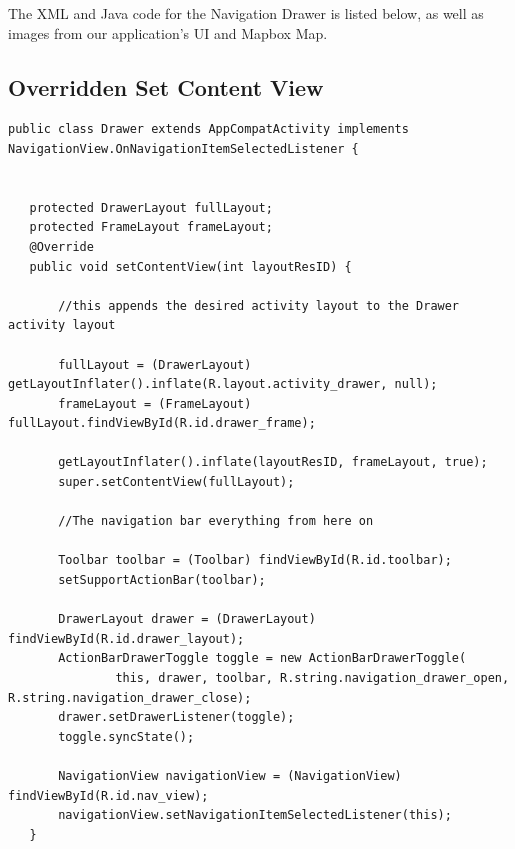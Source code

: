 \documentclass[letterpaper, 10pt,titlepage]{article}
\begin{document}
The XML and Java code for the Navigation Drawer is listed below, as well as images from our application's UI and Mapbox Map.

\subsection{Overridden Set Content View}
\begin{verbatim}
public class Drawer extends AppCompatActivity implements NavigationView.OnNavigationItemSelectedListener {


   protected DrawerLayout fullLayout;
   protected FrameLayout frameLayout;
   @Override
   public void setContentView(int layoutResID) {

       //this appends the desired activity layout to the Drawer activity layout

       fullLayout = (DrawerLayout) getLayoutInflater().inflate(R.layout.activity_drawer, null);
       frameLayout = (FrameLayout) fullLayout.findViewById(R.id.drawer_frame);

       getLayoutInflater().inflate(layoutResID, frameLayout, true);
       super.setContentView(fullLayout);

       //The navigation bar everything from here on

       Toolbar toolbar = (Toolbar) findViewById(R.id.toolbar);
       setSupportActionBar(toolbar);

       DrawerLayout drawer = (DrawerLayout) findViewById(R.id.drawer_layout);
       ActionBarDrawerToggle toggle = new ActionBarDrawerToggle(
               this, drawer, toolbar, R.string.navigation_drawer_open, R.string.navigation_drawer_close);
       drawer.setDrawerListener(toggle);
       toggle.syncState();

       NavigationView navigationView = (NavigationView) findViewById(R.id.nav_view);
       navigationView.setNavigationItemSelectedListener(this);
   }
\end{verbatim}
\end{document}
